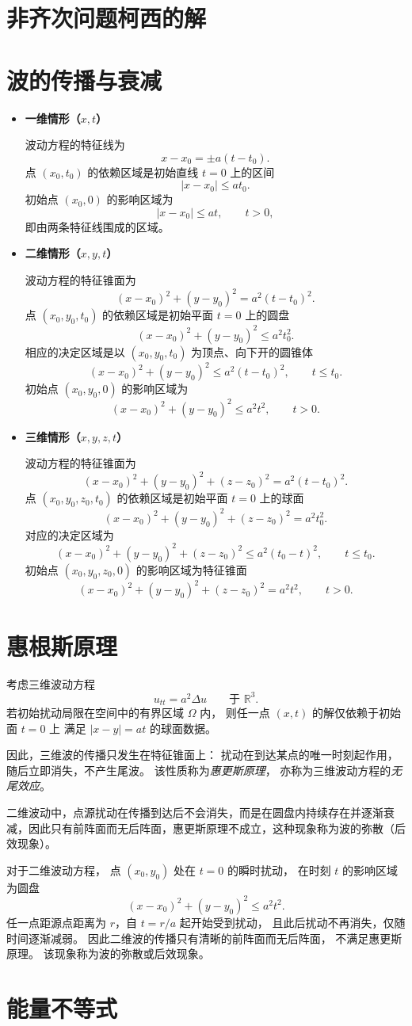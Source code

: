\section{非齐次问题柯西的解}
\section{波的传播与衰减}
\begin{itemize}
  \item \textbf{一维情形（$x,t$）}
  
  波动方程的特征线为
  \[
  x-x_0=\pm a(t-t_0).
  \]
  点 $(x_0,t_0)$ 的依赖区域是初始直线 $t=0$ 上的区间
  \[
  |x-x_0|\le at_0.
  \]
  初始点 $(x_0,0)$ 的影响区域为
  \[
  |x-x_0|\le at,\qquad t>0,
  \]
  即由两条特征线围成的区域。

  \item \textbf{二维情形（$x,y,t$）}
  
  波动方程的特征锥面为
  \[
  (x-x_0)^2+(y-y_0)^2=a^2(t-t_0)^2.
  \]
  点 $(x_0,y_0,t_0)$ 的依赖区域是初始平面 $t=0$ 上的圆盘
  \[
  (x-x_0)^2+(y-y_0)^2\le a^2t_0^2.
  \]
  相应的决定区域是以 $(x_0,y_0,t_0)$ 为顶点、向下开的圆锥体
  \[
  (x-x_0)^2+(y-y_0)^2\le a^2(t-t_0)^2,\qquad t\le t_0.
  \]
  初始点 $(x_0,y_0,0)$ 的影响区域为
  \[
  (x-x_0)^2+(y-y_0)^2\le a^2t^2,\qquad t>0.
  \]

  \item \textbf{三维情形（$x,y,z,t$）}
  
  波动方程的特征锥面为
  \[
  (x-x_0)^2+(y-y_0)^2+(z-z_0)^2=a^2(t-t_0)^2.
  \]
  点 $(x_0,y_0,z_0,t_0)$ 的依赖区域是初始平面 $t=0$ 上的球面
  \[
  (x-x_0)^2+(y-y_0)^2+(z-z_0)^2=a^2t_0^2.
  \]
  对应的决定区域为
  \[
  (x-x_0)^2+(y-y_0)^2+(z-z_0)^2\le a^2(t_0-t)^2,\qquad t\le t_0.
  \]
  初始点 $(x_0,y_0,z_0,0)$ 的影响区域为特征锥面
  \[
  (x-x_0)^2+(y-y_0)^2+(z-z_0)^2=a^2t^2,\qquad t>0.
  \]
\end{itemize}
\section{惠根斯原理}
\begin{theorem}
考虑三维波动方程
\[
u_{tt}=a^2\Delta u \qquad \text{于 } \mathbb R^3.
\]
若初始扰动局限在空间中的有界区域 $\Omega$ 内，
则任一点 $(x,t)$ 的解仅依赖于初始面 $t=0$ 上
满足 $|x-y|=at$ 的球面数据。

因此，三维波的传播只发生在特征锥面上：
扰动在到达某点的唯一时刻起作用，
随后立即消失，不产生尾波。
该性质称为\emph{惠更斯原理}，
亦称为三维波动方程的\emph{无尾效应}。
\end{theorem}
二维波动中，点源扰动在传播到达后不会消失，而是在圆盘内持续存在并逐渐衰减，因此只有前阵面而无后阵面，惠更斯原理不成立，这种现象称为波的弥散（后效现象）。
\begin{theorem}[二维波动的后效现象]
对于二维波动方程，
点 $(x_0,y_0)$ 处在 $t=0$ 的瞬时扰动，
在时刻 $t$ 的影响区域为圆盘
\[
(x-x_0)^2+(y-y_0)^2\le a^2t^2.
\]
任一点距源点距离为 $r$，自 $t=r/a$ 起开始受到扰动，
且此后扰动不再消失，仅随时间逐渐减弱。
因此二维波的传播只有清晰的前阵面而无后阵面，
不满足惠更斯原理。
该现象称为波的弥散或后效现象。
\end{theorem}
\section{能量不等式}